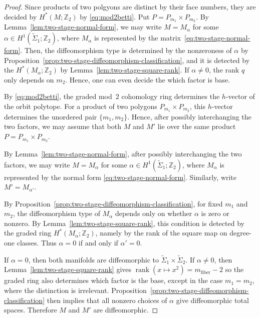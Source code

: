 \documentclass{amsart}
\numberwithin{equation}{section}
\theoremstyle{definition}
\theoremstyle{remark}
\newcommand{\Z}{\mathbb Z}
\DeclareMathOperator{\rank}{rank}
\begin{document}
\begin{proof}
    Since products of two polgyons are distinct by their face numbers, they are decided by $H^\ast(M;\Z_2)$ by \eqref{eq:mod2betti}.
    Put $P =P_{m_1} \times P_{m_2}$.
    By Lemma~\ref{lem:two-stage-normal-form}, we may write $M=M_\alpha$ for some $\alpha\in H^1(\widetilde\Sigma_1;\Z_2)$, where $M_\alpha$ is represented by the matrix~\eqref{eq:two-stage-normal-form}. 
    Then, the diffeomorphism type is determined by the nonzeroness of $\alpha$ by Proposition~\ref{prop:two-stage-diffeomorphism-classification}, and it is detected by the $H^\ast(M_\alpha;\Z_2)$ by Lemma~\ref{lem:two-stage-square-rank}.
    If $\alpha \neq 0$, the rank $q$ only depends on $m_2$. 
    Hence, one can even decide the which factor is base.
    
    By \eqref{eq:mod2betti}, the graded mod~$2$ cohomology ring determines the $h$-vector of the orbit polytope. 
    For a product of two polygons $P_{m_1}\times P_{m_2}$, this $h$-vector determines the unordered pair $\{m_1,m_2\}$. 
    Hence, after possibly interchanging the two factors, we may assume that both $M$ and $M'$ lie over the same product $P=P_{m_1} \times P_{m_2}$.
    
    By Lemma~\ref{lem:two-stage-normal-form}, after possibly interchanging the two factors, we may write $M=M_\alpha$ for some $\alpha\in H^1(\widetilde\Sigma_1;\Z_2)$, where $M_\alpha$ is represented by the normal form \eqref{eq:two-stage-normal-form}. 
    Similarly, write $M'=M_{\alpha'}$.
    
    By Proposition~\ref{prop:two-stage-diffeomorphism-classification}, for fixed $m_1$ and $m_2$, the diffeomorphism type of $M_\alpha$ depends only on whether
    $\alpha$ is zero or nonzero. 
    By Lemma~\ref{lem:two-stage-square-rank}, this condition is detected by the graded ring $H^\ast(M_\alpha;\Z_2)$, namely by the rank of the square map on degree-one classes.
    Thus $\alpha=0$ if and only if $\alpha'=0$.
    
    If $\alpha=0$, then both manifolds are diffeomorphic to $\widetilde\Sigma_1\times \widetilde\Sigma_2$.
    If $\alpha\ne0$, then Lemma~\ref{lem:two-stage-square-rank} gives $\rank(x\mapsto x^2)=m_{\mathrm{fiber}}-2$ so the graded ring also determines which factor is the base, except in the case $m_1=m_2$, where the distinction is irrelevant. 
    Proposition~\ref{prop:two-stage-diffeomorphism-classification} then implies that all nonzero choices of $\alpha$ give diffeomorphic total spaces.
    Therefore $M$ and $M'$ are diffeomorphic.
\end{proof}
\end{document}
